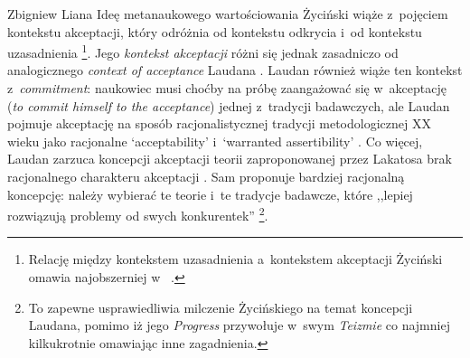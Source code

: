 \begin{artplenv}{Zbigniew Liana}
Ideę metanaukowego wartościowania Życiński wiąże z~pojęciem kontekstu akceptacji, który odróżnia od kontekstu odkrycia i~od kontekstu uzasadnienia
\parencite[zob.][s.~225]{zycinski_teizm_1985}%
\footnote{Relację między kontekstem uzasadnienia a~kontekstem akceptacji Życiński omawia najobszerniej w~
\parencite[][s.~216–232]{zycinski_teizm_1985}. %
 }. Jego \textit{kontekst akceptacji} różni się jednak zasadniczo od analogicznego \textit{context of acceptance} Laudana 
\parencite*[][s.~108nn]{laudan_progress_1977}. %
 Laudan również wiąże ten kontekst z~\textit{commitment}: naukowiec musi choćby na próbę zaangażować się w~akceptację (\textit{to commit himself to the acceptance}) jednej z~tradycji badawczych, ale Laudan pojmuje akceptację na sposób racjonalistycznej tradycji metodologicznej XX wieku jako racjonalne ‘acceptability' i~‘warranted assertibility' 
\parencite[][s.~110]{laudan_progress_1977}. %
 Co więcej, Laudan zarzuca koncepcji akceptacji teorii zaproponowanej przez Lakatosa brak racjonalnego charakteru akceptacji 
\parencite[][s.~77n]{laudan_progress_1977}. %
 Sam proponuje bardziej racjonalną koncepcję: należy wybierać te teorie i~te tradycje badawcze, które ,,lepiej rozwiązują problemy od swych konkurentek'' 
\parencite[][s.~109]{laudan_progress_1977}%
\footnote{To zapewne usprawiedliwia milczenie Życińskiego na temat koncepcji Laudana, pomimo iż jego \textit{Progress} 
\parencite*[][]{laudan_progress_1977} %
 przywołuje w~swym \textit{Teizmie} 
\parencite*[][]{zycinski_teizm_1985} %
 co najmniej kilkukrotnie omawiając inne zagadnienia.}.


\end{artplenv}

